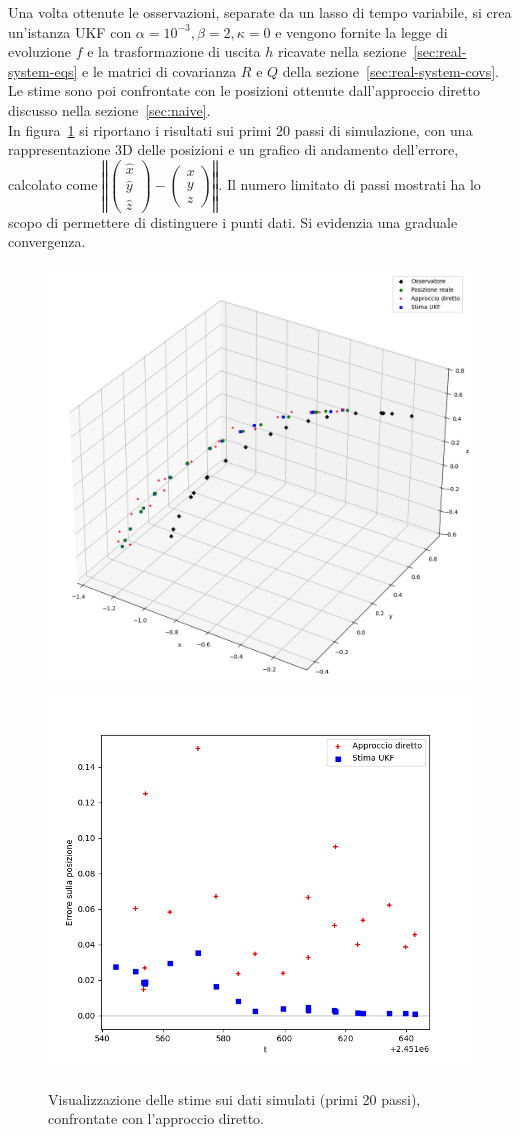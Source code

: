 \documentclass[12pt,a4paper,openright,twoside]{book}
\begin{document}
Una volta ottenute le osservazioni, separate da un lasso di tempo variabile, si crea un'istanza UKF con $\alpha=10^{-3},\beta=2,\kappa=0$ e vengono fornite la legge di evoluzione $f$ e la trasformazione di uscita $h$ ricavate nella sezione~\ref{sec:real-system-eqs} e le matrici di covarianza $R$ e $Q$ della sezione~\ref{sec:real-system-covs}. Le stime sono poi confrontate con le posizioni ottenute dall'approccio diretto discusso nella sezione~\ref{sec:naive}. \\

In figura~\ref{fig:sim20} si riportano i risultati sui primi 20 passi di simulazione, con una rappresentazione 3D delle posizioni e un grafico di andamento dell'errore, calcolato come $\left\Vert\left(\begin{smallmatrix}\hat{x}\\\hat{y}\\\hat{z}\end{smallmatrix}\right)-\left(\begin{smallmatrix}x\\y\\z\end{smallmatrix}\right)\right\Vert$. Il numero limitato di passi mostrati ha lo scopo di permettere di distinguere i punti dati. Si evidenzia una graduale convergenza.

\begin{figure}
    \includegraphics[width=0.55\linewidth]{figures/simulation_20_3d.png}
    \includegraphics[width=0.45\linewidth]{figures/simulation_20_error.png}
    \caption{Visualizzazione delle stime sui dati simulati (primi 20 passi), confrontate con l'approccio diretto.}
    \label{fig:sim20}
    \vspace{2\baselineskip}
\end{figure}
\end{document}
